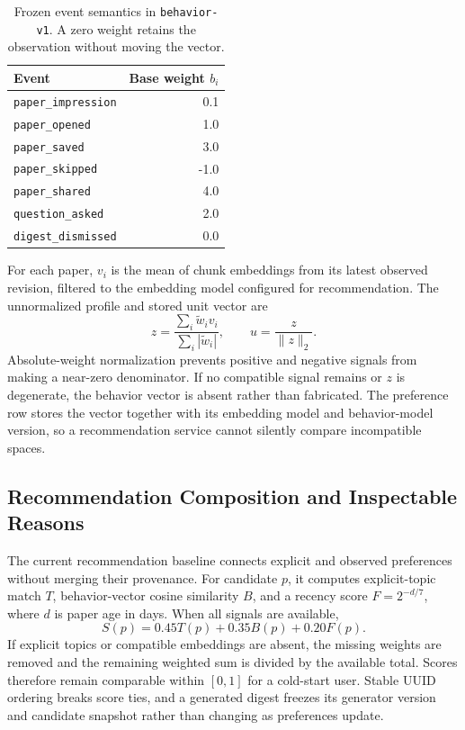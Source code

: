 \begin{table}[htbp]
\centering
\caption{Frozen event semantics in \texttt{behavior-v1}. A zero weight retains the observation without moving the vector.}
\label{tab:behavior-weights}
\begin{tabular}{@{}lr@{}}
\toprule
Event & Base weight \(b_i\) \\
\midrule
\texttt{paper\_impression} & 0.1 \\
\texttt{paper\_opened} & 1.0 \\
\texttt{paper\_saved} & 3.0 \\
\texttt{paper\_skipped} & -1.0 \\
\texttt{paper\_shared} & 4.0 \\
\texttt{question\_asked} & 2.0 \\
\texttt{digest\_dismissed} & 0.0 \\
\bottomrule
\end{tabular}
\end{table}

For each paper, \(v_i\) is the mean of chunk embeddings from its latest observed revision, filtered to the embedding model configured for recommendation. The unnormalized profile and stored unit vector are
\[
  z=\frac{\sum_i \widetilde{w}_i v_i}{\sum_i |\widetilde{w}_i|},
  \qquad
  u=\frac{z}{\lVert z\rVert_2}.
\]
Absolute-weight normalization prevents positive and negative signals from making a near-zero denominator. If no compatible signal remains or \(z\) is degenerate, the behavior vector is absent rather than fabricated. The preference row stores the vector together with its embedding model and behavior-model version, so a recommendation service cannot silently compare incompatible spaces.

\subsection{Recommendation Composition and Inspectable Reasons}

The current recommendation baseline connects explicit and observed preferences without merging their provenance. For candidate \(p\), it computes explicit-topic match \(T\), behavior-vector cosine similarity \(B\), and a recency score \(F=2^{-d/7}\), where \(d\) is paper age in days. When all signals are available,
\[
  S(p)=0.45T(p)+0.35B(p)+0.20F(p).
\]
If explicit topics or compatible embeddings are absent, the missing weights are removed and the remaining weighted sum is divided by the available total. Scores therefore remain comparable within \([0,1]\) for a cold-start user. Stable UUID ordering breaks score ties, and a generated digest freezes its generator version and candidate snapshot rather than changing as preferences update.

